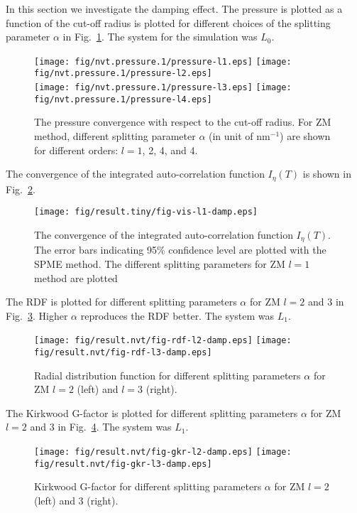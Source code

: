 \documentclass[aip,jcp,a4paper,reprint,unsortedaddress,onecolumn,fleqn]{revtex4-1}
\begin{document}
In this section we investigate the damping effect. The pressure is plotted as a function of  the cut-off radius is plotted for different choices of
the splitting parameter $\alpha$ in Fig.~\ref{fig:damp-pres}. The system for the simulation was $L_0$.
\begin{figure}
  \centering
  \texttt{[image: fig/nvt.pressure.1/pressure-l1.eps]}
  \texttt{[image: fig/nvt.pressure.1/pressure-l2.eps]}\\
  \texttt{[image: fig/nvt.pressure.1/pressure-l3.eps]}
  \texttt{[image: fig/nvt.pressure.1/pressure-l4.eps]}
  \caption{The pressure convergence with respect to the cut-off radius.
    For ZM method, different splitting parameter $\alpha$ (in unit of $\textrm{nm}^{-1}$) are shown for different orders:  $l=1$, 2, 4, and 4.
  }
  \label{fig:damp-pres}
\end{figure}

The convergence of the integrated auto-correlation function $I_\eta(T) $ is shown in Fig.~\ref{fig:damp-vis-l1}.
\begin{figure}
  \centering
  \texttt{[image: fig/result.tiny/fig-vis-l1-damp.eps]}
  \caption{The convergence of the integrated auto-correlation function $I_\eta(T) $. The error bars indicating 95\% confidence level are plotted with the SPME method. The different splitting parameters for ZM $l=1$ method are plotted}
  \label{fig:damp-vis-l1}
\end{figure}


The RDF is plotted for different splitting parameters $\alpha$ for ZM $l=2$ and 3 in Fig.~\ref{fig:damp-rdf-l23}. Higher $\alpha$ reproduces the RDF better.
The system was $L_1$.
\begin{figure}[]
  \centering
  \texttt{[image: fig/result.nvt/fig-rdf-l2-damp.eps]}
  \texttt{[image: fig/result.nvt/fig-rdf-l3-damp.eps]}
  \caption{Radial distribution function for different splitting parameters $\alpha$ for ZM $l=2$ (left) and $l=3$ (right).}
  \label{fig:damp-rdf-l23}
\end{figure}

The Kirkwood G-factor is plotted for different splitting parameters $\alpha$ for ZM $l=2$ and 3 in Fig.~\ref{fig:damp-gkr-l23}. 
The system was $L_1$.
\begin{figure}[]
  \centering
  \texttt{[image: fig/result.nvt/fig-gkr-l2-damp.eps]}
  \texttt{[image: fig/result.nvt/fig-gkr-l3-damp.eps]}
  \caption{Kirkwood G-factor for different splitting parameters $\alpha$ for ZM $l=2$ (left) and 3 (right).}
  \label{fig:damp-gkr-l23}
\end{figure}
\end{document}
